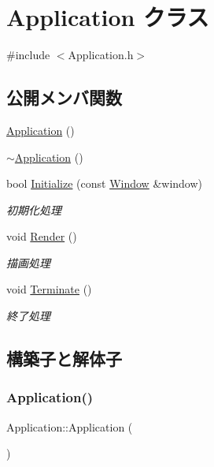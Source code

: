 \hypertarget{class_application}{}\section{Application クラス}
\label{class_application}


{\ttfamily \#include $<$Application.\+h$>$}

\subsection*{公開メンバ関数}
\begin{DoxyCompactItemize}
\item 
\mbox{\hyperlink{class_application_afa8cc05ce6b6092be5ecdfdae44e05f8}{Application}} ()
\item 
\mbox{\hyperlink{class_application_a748bca84fefb9c12661cfaa2f623748d}{$\sim$\+Application}} ()
\item 
bool \mbox{\hyperlink{class_application_a4b5480da6d4e414f1b32cf2a40ab457a}{Initialize}} (const \mbox{\hyperlink{class_window}{Window}} \&window)
\begin{DoxyCompactList}\small\item\em 初期化処理 \end{DoxyCompactList}\item 
void \mbox{\hyperlink{class_application_a6f40ffdb97f3a938ae19ea4eae4882ed}{Render}} ()
\begin{DoxyCompactList}\small\item\em 描画処理 \end{DoxyCompactList}\item 
void \mbox{\hyperlink{class_application_adac7ae00e5a8b79f75295d8a79aef852}{Terminate}} ()
\begin{DoxyCompactList}\small\item\em 終了処理 \end{DoxyCompactList}\end{DoxyCompactItemize}


\subsection{構築子と解体子}
\mbox{\label{class_application_afa8cc05ce6b6092be5ecdfdae44e05f8}} 
\subsubsection{\texorpdfstring{Application()}{Application()}}
{\footnotesize\ttfamily Application\+::\+Application (\begin{DoxyParamCaption}{ }\end{DoxyParamCaption})}

